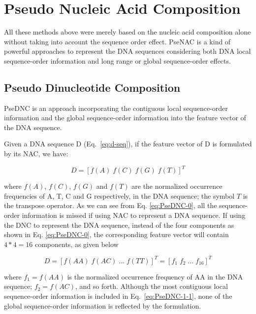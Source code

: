 \section{Pseudo Nucleic Acid Composition}

All these methods above were merely based on the nucleic acid composition alone without taking into account the sequence order effect.
\gls{PseNAC} is a kind of powerful approaches to represent the DNA sequences considering both DNA local sequence-order information and long range or global sequence-order effects.

\subsection{Pseudo Dinucleotide Composition}


\gls{PseDNC} is an approach incorporating the contiguous local sequence-order information and the global sequence-order information into the feature vector of the DNA sequence. 

Given a DNA sequence D (Eq.~\ref{eq:d-seq}), if the feature vector of D is formulated by its \gls{NAC}, we have:

\begin{equation}\label{eq:PseDNC-0}
    D = [f(A)\;f(C)\;f(G)\;f(T)]^{T}
\end{equation}

where $f(A)$, $f(C)$, $f(G)$ and $f(T)$ are the normalized occurrence frequencies of \gls{A}, \gls{T}, \gls{C} and \gls{G} respectively, in the \gls{DNA} sequence; the symbol $T$ is the transpose operator. As we can see from Eq. \ref{eq:PseDNC-0}, all the sequence-order information is missed if using \gls{NAC} to represent a \gls{DNA} sequence. If using the \gls{DNC} to represent the \gls{DNA} sequence, instead of the four components as shown in Eq. \ref{eq:PseDNC-0}, the corresponding feature vector will contain $4 * 4 = 16$ components, as given below

\begin{equation}\label{eq:PseDNC-1-1}
    D = [f(AA)\;f(AC)\;...\;f(TT)]^{T} = [f_{1}\;f_{2} \;...\;f_{16}]^{T}
\end{equation}

where $f_{1} = f(AA)$ is the normalized occurrence frequency of AA in the \gls{DNA} sequence; $f_{2} = f(AC)$⁠, and so forth. Although the most contiguous local sequence-order information is included in Eq.~\ref{eq:PseDNC-1-1}, none of the global sequence-order information is reflected by the formulation. 

